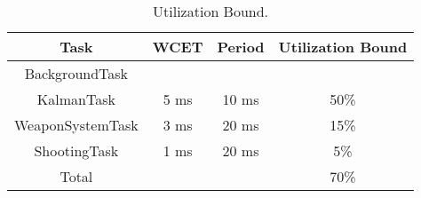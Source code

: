 \begin{table}[H]
\centering
\setlength\extrarowheight{3pt}
\begin{tabulary}{\textwidth}{|C|C|C|C|}
\hline
\textbf{Task} & \textbf{WCET} & \textbf{Period} & \textbf{Utilization Bound} \\ 
\hline
BackgroundTask            &                           &        &                   \\
\hline
KalmanTask                & 5 ms                      & 10 ms  & 50\%              \\
\hline
WeaponSystemTask          & 3 ms                      & 20 ms  & 15\%              \\
\hline
ShootingTask              & 1 ms                      & 20 ms  & 5\%               \\ 
\hline
Total                     &                           &        & 70\%              \\ 
\hline
\end{tabulary}
\caption{Utilization Bound.}
\label{UtilizationBound}
\end{table}
\FloatBarrier